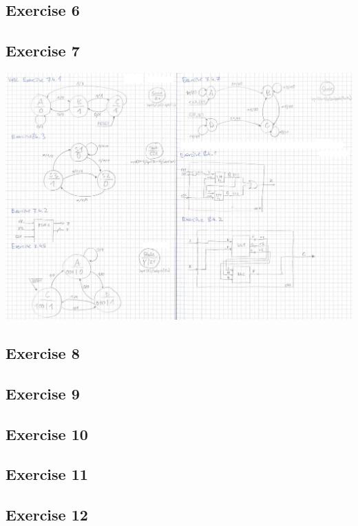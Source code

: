 \subsection*{Exercise 6}

\subsection*{Exercise 7}
\includegraphics[width=\textwidth, clip, trim={1608 1624 5 72}]{pics/solutions/chapter7+8_draft.jpg}

\subsection*{Exercise 8}

\subsection*{Exercise 9}

\subsection*{Exercise 10}

\subsection*{Exercise 11}

\subsection*{Exercise 12}

